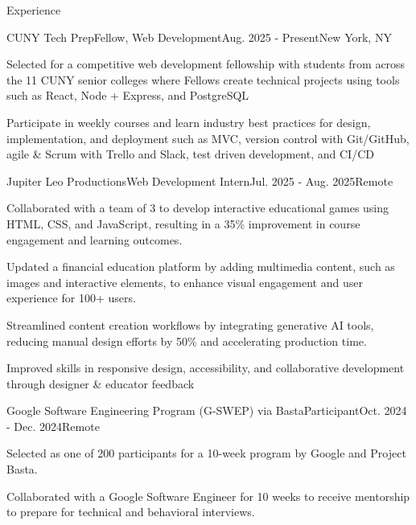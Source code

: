 \documentclass[]{rh-resume}
\begin{document}
\vspace{-0.5em}
\begin{section}{Experience}
    \begin{subsection}{CUNY Tech Prep}{Fellow, Web Development}{Aug. 2025 - Present}{New York, NY}
        \item Selected for a competitive web development fellowship with students from across the 11 CUNY senior colleges where Fellows create technical projects using tools such as React, Node + Express, and PostgreSQL
        \item Participate in weekly courses and learn industry best practices for design, implementation, and deployment such as MVC, version control with Git/GitHub, agile \& Scrum with Trello and Slack, test driven development, and CI/CD
    \end{subsection}

    \begin{subsection}{Jupiter Leo Productions}{Web Development Intern}{Jul. 2025 - Aug. 2025}{Remote}
        \item Collaborated with a team of 3 to develop interactive educational games using HTML, CSS, and JavaScript, resulting in a 35\% improvement in course engagement and learning outcomes.
        \item Updated a financial education platform by adding multimedia content, such as images and interactive elements, to enhance visual engagement and user experience for 100+ users.
        \item Streamlined content creation workflows by integrating generative AI tools, reducing manual design efforts by 50\% and accelerating production time.
        \item Improved skills in responsive design, accessibility, and collaborative development through designer \& educator feedback
    \end{subsection}

    \begin{subsection}{Google Software Engineering Program (G-SWEP) via Basta}{Participant}{Oct. 2024 - Dec. 2024}{Remote}
        \item Selected as one of 200 participants for a 10-week program by Google and Project Basta.
        \item Collaborated with a Google Software Engineer for 10 weeks to receive mentorship to prepare for technical and behavioral interviews.
    \end{subsection}

\end{section}
\end{document}
